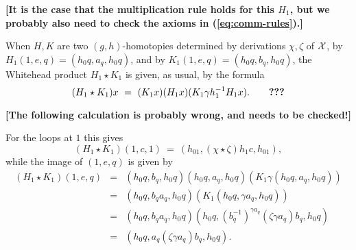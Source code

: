 \bigskip\noindent
{\bf [It is the case that the multiplication rule holds for this $H_1$, 
but we probably also need to check the axioms in (\ref{eq:comm-rules}).]}

\bigskip\noindent 
When $H,K$ are two $(g,h)$-homotopies determined by derivations 
$\chi,\zeta$ of $\mathcal{X}$, 
by $H_1(1,e,q) = (h_0q,a_q,h_0q)$, and by $K_1(1,e,q) = (h_0q,b_q,h_0q)$, 
the Whitehead product $H_1 \star K_1$ is given, as usual, by the formula 
$$
(H_1 \star K_1)x ~=~ (K_1 x)(H_1 x)(K_1 \gamma h_1^{-1} H_1 x). 
\qquad\text{{\bf ???}} 
$$

\medskip\noindent
{\bf [The following calculation is probably wrong, and needs to be checked!]}

\medskip\noindent
For the loops at $1$ this gives 
$$
(H_1 \star K_1)(1,c,1) ~=~ (h_01, (\chi\star\zeta)h_1c, h_01),  
$$
while the image of $(1,e,q)$ is given by 
\begin{eqnarray*}
(H_1 \star K_1)(1,e,q) 
  &=&  (h_0q,b_q,h_0q)(h_0q,a_q,h_0q)(K_1\gamma(h_0q,a_q,h_0q)) \\
  &=&  (h_0q,b_qa_q,h_0q)(K_1(h_0q,\gamma a_q,h_0q)) \\
  &=&  (h_0q,b_qa_q,h_0q)(h_0q,(b_q^{-1})^{\gamma a_q}
         (\zeta\gamma a_q)b_q,h_0q) \\
  &=&  (h_0q,a_q(\zeta\gamma a_q)b_q,h_0q).
\end{eqnarray*}

